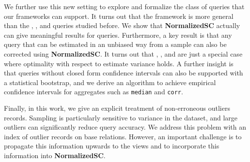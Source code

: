 We further use this new setting to explore and formalize the class of queries that our frameworks can support.
It turns out that the framework is more general than the \sumfunc, \avgfunc, and \countfunc queries studied before.
We show that \textbf{NormalizedSC} actually can give meaningful results for \selectfunc queries.
Furthermore, a key result is that any query that can be estimated in an unbiased way from a sample can also be corrected using \textbf{NormalizedSC}.
It turns out that \sumfunc, \avgfunc, and \countfunc are just a special case where optimality with respect to estimate variance holds.
A further insight is that queries without closed form confidence intervals can also be supported with a statistical bootstrap, and we
derive an algorithm to achieve empirical confidence intervals for aggregates such as \texttt{median} and \texttt{corr}.

Finally, in this work, we give an explicit treatment of non-erroneous outliers records.
Sampling is particularly sensitive to variance in the dataset, and large outliers can significantly reduce query accuracy.
We address this problem with an index of outlier records on base relations.
However, an important challenge is to propagate this information upwards to the views and to incorporate this information into \textbf{NormalizedSC}.





